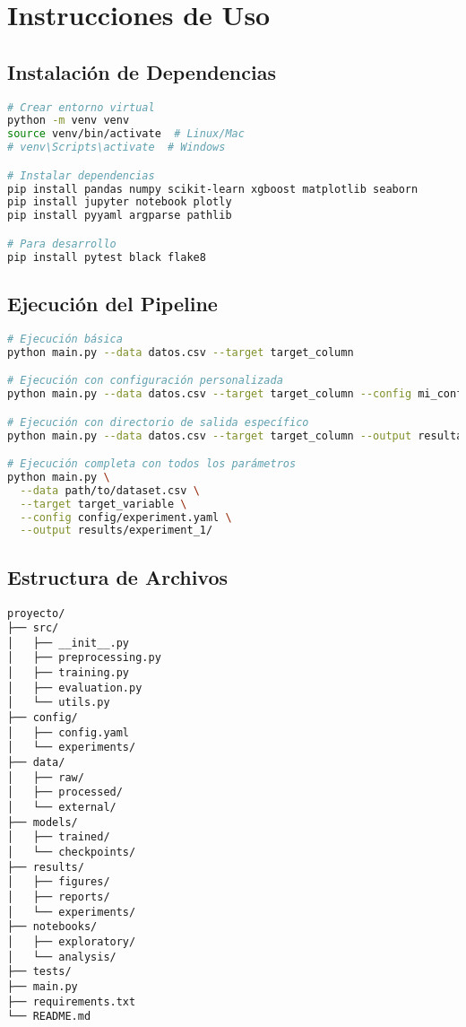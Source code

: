 \section{Instrucciones de Uso}

\subsection{Instalación de Dependencias}

\begin{lstlisting}[language=bash, caption=Instalación de dependencias]
# Crear entorno virtual
python -m venv venv
source venv/bin/activate  # Linux/Mac
# venv\Scripts\activate  # Windows

# Instalar dependencias
pip install pandas numpy scikit-learn xgboost matplotlib seaborn
pip install jupyter notebook plotly
pip install pyyaml argparse pathlib

# Para desarrollo
pip install pytest black flake8
\end{lstlisting}

\subsection{Ejecución del Pipeline}

\begin{lstlisting}[language=bash, caption=Comandos de ejecución]
# Ejecución básica
python main.py --data datos.csv --target target_column

# Ejecución con configuración personalizada
python main.py --data datos.csv --target target_column --config mi_config.yaml

# Ejecución con directorio de salida específico
python main.py --data datos.csv --target target_column --output resultados/

# Ejecución completa con todos los parámetros
python main.py \
  --data path/to/dataset.csv \
  --target target_variable \
  --config config/experiment.yaml \
  --output results/experiment_1/
\end{lstlisting}

\subsection{Estructura de Archivos}

\begin{lstlisting}[caption=Estructura recomendada del proyecto]
proyecto/
├── src/
│   ├── __init__.py
│   ├── preprocessing.py
│   ├── training.py
│   ├── evaluation.py
│   └── utils.py
├── config/
│   ├── config.yaml
│   └── experiments/
├── data/
│   ├── raw/
│   ├── processed/
│   └── external/
├── models/
│   ├── trained/
│   └── checkpoints/
├── results/
│   ├── figures/
│   ├── reports/
│   └── experiments/
├── notebooks/
│   ├── exploratory/
│   └── analysis/
├── tests/
├── main.py
├── requirements.txt
└── README.md
\end{lstlisting}
